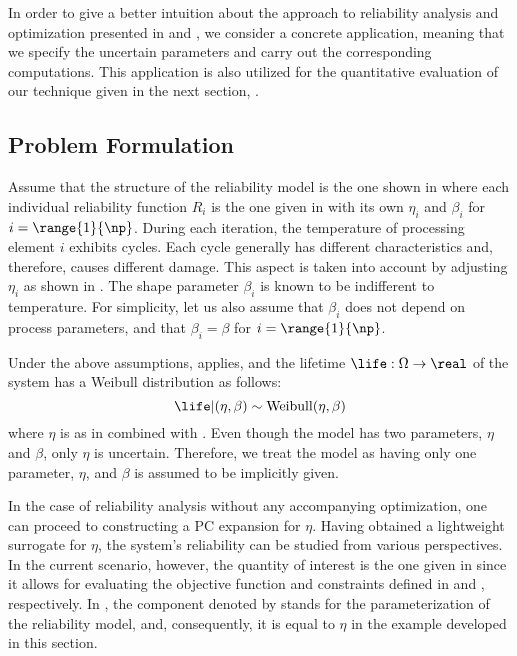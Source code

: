 In order to give a better intuition about the approach to reliability analysis
and optimization presented in  and
, we consider a concrete application,
meaning that we specify the uncertain parameters and carry out the corresponding
computations. This application is also utilized for the quantitative evaluation
of our technique given in the next section, .

\subsection{Problem Formulation}

Assume that the structure of the reliability model is the one shown in
 where each individual reliability function $R_i$ is the
one given in  with its own $\eta_i$ and $\beta_i$ for
$i = \range{1}{\np}$. During each iteration, the temperature of processing
element $i$ exhibits  cycles. Each cycle generally has different
characteristics and, therefore, causes different damage. This aspect is taken
into account by adjusting $\eta_i$ as shown in . The
shape parameter $\beta_i$ is known to be indifferent to temperature. For
simplicity, let us also assume that $\beta_i$ does not depend on process
parameters, and that $\beta_i = \beta$ for $i = \range{1}{\np}$.

Under the above assumptions,  applies, and the
lifetime $\life: \Omega \to \real$ of the system has a Weibull distribution as
follows:
\[
  \life | (\eta, \beta) \sim \mathrm{Weibull}(\eta, \beta)
\]
where $\eta$ is as in  combined with
. Even though the model has two parameters, $\eta$
and $\beta$, only $\eta$ is uncertain. Therefore, we treat the model as having
only one parameter, $\eta$, and $\beta$ is assumed to be implicitly given.

In the case of reliability analysis without any accompanying optimization, one
can proceed to constructing a \ac{PC} expansion for $\eta$. Having obtained a
lightweight surrogate for $\eta$, the system's reliability can be studied from
various perspectives. In the current scenario, however, the quantity of interest
\g is the one given in  since it allows for
evaluating the objective function and constraints defined in
 and ,
respectively. In , the component denoted by
\life stands for the parameterization of the reliability model, and,
consequently, it is equal to $\eta$ in the example developed in this section.

